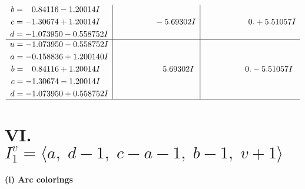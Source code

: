 \documentclass[1p]{elsarticle_modified}
\theoremstyle{definition}
\begin{document}
$$\begin{array}{c|c|c}
\begin{aligned}
b &= \phantom{-}0.84116 - 1.20014 I \\
c &= -1.30674 + 1.20014 I \\
d &= -1.073950 - 0.558752 I\end{aligned}
 & \phantom{-0.000000 } -5.69302 I & \phantom{-0.000000 -}0. + 5.51057 I \\ \hline\begin{aligned}
u &= -1.073950 - 0.558752 I \\
a &= -0.158836 + 1.200140 I \\
b &= \phantom{-}0.84116 + 1.20014 I \\
c &= -1.30674 - 1.20014 I \\
d &= -1.073950 + 0.558752 I\end{aligned}
 & \phantom{-0.000000 -}5.69302 I & \phantom{-0.000000 } 0. - 5.51057 I\\
 \hline 
 \end{array}$$\newpage\newpage\renewcommand{\arraystretch}{1}
\centering \section*{VI. $I^v_{1}= \langle a,\;d-1,\;c- a-1,\;b-1,\;v+1 \rangle$}
\flushleft \textbf{(i) Arc colorings}\\
\end{document}
